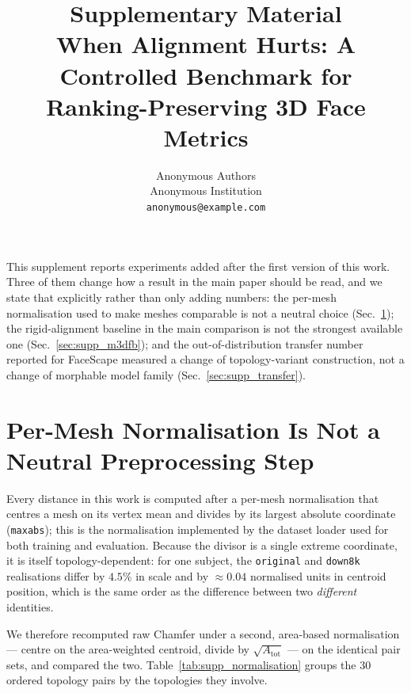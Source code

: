 \documentclass{article}
\title{Supplementary Material\\
\large When Alignment Hurts: A Controlled Benchmark for Ranking-Preserving 3D Face Metrics}
\author{%
  Anonymous Authors \\
  Anonymous Institution \\
  \texttt{anonymous@example.com}
}
\begin{document}
\maketitle

\noindent
This supplement reports experiments added after the first version of this work. Three
of them change how a result in the main paper should be read, and we state that
explicitly rather than only adding numbers: the per-mesh normalisation used to make
meshes comparable is not a neutral choice (Sec.~\ref{sec:supp_normalisation}); the
rigid-alignment baseline in the main comparison is not the strongest available one
(Sec.~\ref{sec:supp_m3dfb}); and the out-of-distribution transfer number reported for
FaceScape measured a change of topology-variant construction, not a change of morphable
model family (Sec.~\ref{sec:supp_transfer}).

\section{Per-Mesh Normalisation Is Not a Neutral Preprocessing Step}
\label{sec:supp_normalisation}

Every distance in this work is computed after a per-mesh normalisation that centres a
mesh on its vertex mean and divides by its largest absolute coordinate
(\texttt{maxabs}); this is the normalisation implemented by the dataset loader used for
both training and evaluation. Because the divisor is a single extreme coordinate, it is
itself topology-dependent: for one subject, the \texttt{original} and \texttt{down8k}
realisations differ by $4.5\%$ in scale and by $\approx0.04$ normalised units in
centroid position, which is the same order as the difference between two \emph{different}
identities.

We therefore recomputed raw Chamfer under a second, area-based normalisation --- centre
on the area-weighted centroid, divide by $\sqrt{A_{\mathrm{tot}}}$ --- on the identical
pair sets, and compared the two. Table~\ref{tab:supp_normalisation} groups the $30$
ordered topology pairs by the topologies they involve.
\end{document}
